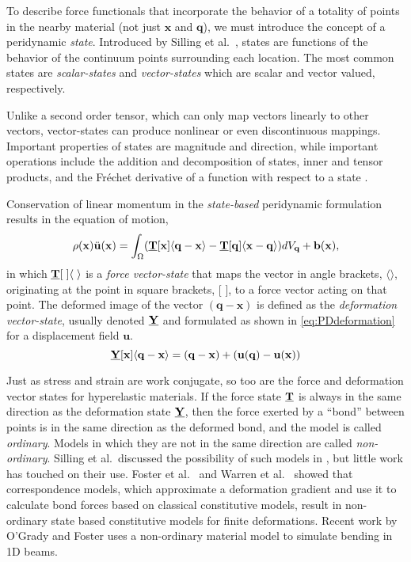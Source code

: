 \documentclass[preprint,review,12pt]{elsarticle}
\newcommand\vstate[3]{%
	\mathbf{\underline{#1}}%
	\ifstrempty{#2}{}{[#2]}%
	\ifstrempty{#3}{}{\langle #3 \rangle}}
\begin{document}
To describe force functionals that incorporate the behavior of a totality of points in the nearby material (not just $\mathbf{x}$ and $\mathbf{q}$), we must introduce the concept of a peridynamic \emph{state}.
Introduced by Silling et al.\ \cite{silling2007peridynamic}, states are functions of the behavior of the continuum points surrounding each location.  The most common states are \emph{scalar-states} and \emph{vector-states} which are scalar and vector valued, respectively.

Unlike a second order tensor, which can only map vectors linearly to other vectors, vector-states can produce nonlinear or even discontinuous mappings.  Important properties of states are magnitude and direction, while important operations include the addition and decomposition of states, inner and tensor products, and the Fr\'{e}chet derivative of a function with respect to a state \cite{silling2007peridynamic}.

Conservation of linear momentum in the \textit{state-based} peridynamic formulation results in the equation of motion,
%
\begin{equation}
    \label{eq:PDstateEoM}
    \rho(\mathbf{x})\ddot{\mathbf{u}}(\mathbf{x}) = \int_\Omega (\vstate{T}{\mathbf{x}}{\mathbf{q}-\mathbf{x}}-\vstate{T}{\mathbf{q}}{\mathbf{x}-\mathbf{q}}) dV_\mathbf{q}  + \mathbf{b}(\mathbf{x}),
\end{equation}
%
in which $\vstate{T}{\;}{\;}$ is a \textit{force vector-state} that maps the vector in angle brackets, $\langle \rangle$, originating at the point in square brackets, [ ], to a force vector acting on that point.
The deformed image of the vector $(\mathbf{q-x})$ is defined as the \textit{deformation vector-state}, usually denoted $\vstate{Y}{}{}$ and formulated as shown in \cref{eq:PDdeformation} for a displacement field \(\mathbf{u}\). 
%
\begin{equation}
    \label{eq:PDdeformation}
    \vstate{Y}{\mathbf{x}}{\mathbf{q}-\mathbf{x}} = (\mathbf{q}-\mathbf{x}) + (\mathbf{u}(\mathbf{q})-\mathbf{u}(\mathbf{x}))
\end{equation}
%

Just as stress and strain are work conjugate, so too are the force and deformation vector states for hyperelastic materials.  If the force state $\vstate{T}{}{}$ is always in the same direction as the deformation state $\vstate{Y}{}{}$, then the force exerted by a ``bond'' between points is in the same direction as the deformed bond, and the model is called \textit{ordinary}.  Models in which they are not in the same direction are called \textit{non-ordinary}.  Silling et al.\ discussed the possibility of such models in \cite{silling2010peridynamic}, but little work has touched on their use.  Foster et al.\ \cite{foster2010viscoplasticity} and Warren et al.\ \cite{warren2009non} showed that correspondence models, which approximate a deformation gradient and use it to calculate bond forces based on classical constitutive models, result in non-ordinary state based constitutive models for finite deformations. Recent work by O'Grady and Foster \cite{ogrady2014beams} uses a non-ordinary material model to simulate bending in 1D beams.
%
\end{document}
